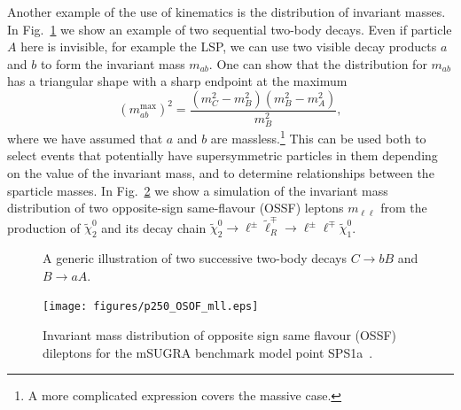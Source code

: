 \documentclass[notes.tex]{subfiles}
\begin{document}
Another example of the use of kinematics is the distribution of invariant masses. In  Fig.~\ref{fig:gen_cascade} we show an example of two sequential  two-body decays. Even if particle $A$ here is invisible, for example the LSP, we can use two visible decay products $a$ and $b$ to form the invariant mass $m_{ab}$. One can show that the distribution for $m_{ab}$ has a triangular shape with a sharp endpoint at the maximum
\begin{equation}
(m_{ab}^{\max})^{2} = \frac{\left(m_{C}^{2}-m_{B}^{2}\right)
\left(m_{B}^{2}-m_{A}^{2}\right)}{m_{B}^{2}}, 
\label{eq:m_ab}
\end{equation}
where we have assumed that $a$ and $b$ are massless.\footnote{A more complicated expression covers the massive case.}  This can be used both to select events that potentially have supersymmetric particles in them depending on the value of the invariant mass, and to determine relationships between the sparticle masses. In Fig.~\ref{fig:mab_measurement} we show a simulation of the invariant mass distribution of two opposite-sign same-flavour  (OSSF) leptons $m_{\ell\ell}$ from the production of $\tilde\chi_2^0$ and its decay chain $\tilde\chi_2^0\to \ell^\pm\tilde\ell_R^\mp \to \ell^\pm\ell^\mp\tilde\chi_1^0$. 

\begin{figure}[h]
\centering
{}
\caption{A generic illustration of two successive two-body decays $C\to bB$ and $B\to aA$.}  
\label{fig:gen_cascade}
\end{figure}

\begin{figure}[h!]
\centering
\texttt{[image: figures/p250\_OSOF\_mll.eps]} 
\caption{Invariant mass distribution of opposite sign same flavour (OSSF) dileptons for the mSUGRA benchmark model point SPS1a~\cite{Gjelsten:2004ki}.}
\label{fig:mab_measurement}
\end{figure}
\end{document}
